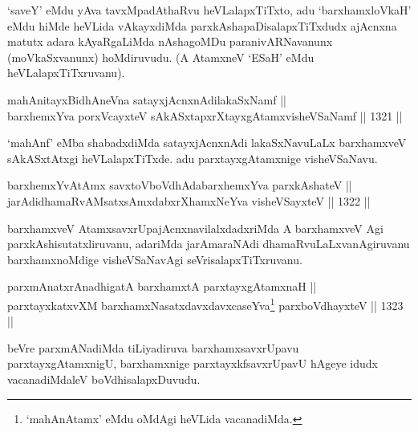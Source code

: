 \begin{artha}
`saveY' eMdu yAva tavxMpadAthaRvu heVLalapxTiTxto, adu `barxhamxloVkaH' eMdu hiMde heVLida vAkayxdiMda parxkAshapaDisalapxTiTxdudx ajAcnxna matutx adara kAyaRgaLiMda nAshagoMDu paranivARNavanunx (moVkaSxvanunx) hoMdiruvudu. (A AtamxneV `ESaH' eMdu heVLalapxTiTxruvanu).
\end{artha}

\begin{shl}
mahAnitayxBidhAneVna satayxjAcnxnAdilakaSxNamf ||  \\
barxhemxYva porxVcayxteV sAkASxtapxrXtayxgAtamxvisheVSaNamf \hfill || 1321 ||  
\end{shl}

\begin{artha}
`mahAnf' eMba shabadxdiMda satayxjAcnxnAdi lakaSxNavuLaLx barxhamxveV sAkASxtAtxgi heVLalapxTiTxde. adu parxtayxgAtamxnige visheVSaNavu.
\end{artha}


\begin{shl}
barxhemxYvA\s \s tAmx savxtoV\s boVdhAdabarxhemxYva parxkAshateV || \\
jarAdidhamaRvAMsatxsAmxdabxrXhamxNeYva visheVSayxteV \hfill || 1322 ||  
\end{shl}

\begin{artha}
barxhamxveV AtamxsavxrUpajAcnxnavilalxdadxriMda A barxhamxveV Agi parxkAshisutatxliruvanu, adariMda jarAmaraNAdi dhamaRvuLaLxvanAgiruvanu barxhamxnoMdige visheVSaNavAgi seVrisalapxTiTxruvanu.
\end{artha}


\begin{shl}
parxmAnatxrAnadhigatA barxhamxtA parxtayxgAtamxnaH || \\
parxtayxkatxvXM barxhamxNasatxdavxdavxcaseYva\footnote{`mahAnAtamx' eMdu oMdAgi heVLida vacanadiMda.} parxboVdhayxteV \hfill || 1323 ||  
\end{shl}


\begin{artha}
beVre parxmANadiMda tiLiyadiruva barxhamxsavxrUpavu parxtayxgAtamxnigU, barxhamxnige parxtayxkfsavxrUpavU hAgeye idudx vacanadiMdaleV boVdhisalapxDuvudu.
\end{artha}


